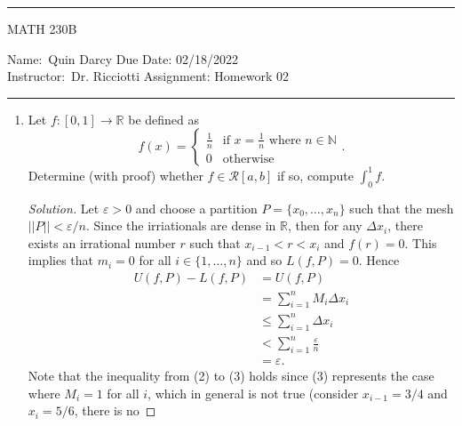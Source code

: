 \documentclass[12pt]{article}
\newenvironment{solution}
{\renewcommand\qedsymbol{$\blacksquare$}\begin{proof}[Solution]}
{\end{proof}}
\begin{document}
    \thispagestyle{empty}\hrule

    \begin{center}
        \vspace{.4cm} { \large MATH 230B}
    \end{center}
    {Name:\ Quin Darcy \hspace{\fill} Due Date: 02/18/2022   \\
    { Instructor:}\ Dr. Ricciotti \hspace{\fill} Assignment:
    Homework 02 \\ \hrule}

    \begin{enumerate}
        \item Let $f:[0, 1]\to\mathbb{R}$ be defined as 
            \begin{equation*}
                f(x)=\begin{cases}\frac{1}{n}&\text{if $x=\frac{1}{n}$ where
                    $n\in\mathbb{N}$} \\
                0 &\text{otherwise}\end{cases}.
            \end{equation*}
            Determine (with proof) whether $f\in\mathcal{R}[a, b]$ if so,
            compute $\int_{0}^{1}f$.
            \begin{solution}
                Let $\varepsilon>0$ and choose a partition $P=\{x_0, \dots,
                x_n\}$ such that the mesh $||P||<\varepsilon/n$. Since the
                irriationals are dense in $\mathbb{R}$, then for any $\Delta
                x_i$, there exists an irrational number $r$ such that
                $x_{i-1}<r<x_i$ and $f(r)=0$. This implies that $m_i=0$ for all
                $i\in\{1, \dots, n\}$ and so $L(f, P)=0$. Hence
                \begin{align}
                    U(f, P)-L(f, P) &= U(f, P) \\
                    &= \sum_{i=1}^{n}M_i\Delta x_i \\
                    &\leq \sum_{i=1}^{n}\Delta x_i \\
                    &< \sum_{i=1}^{n}\frac{\varepsilon}{n} \\
                    &= \varepsilon.
                \end{align}
                Note that the inequality from (2) to (3) holds since (3)
                represents the case where $M_i=1$ for all $i$, which in general
                is not true (consider $x_{i-1}=3/4$ and $x_i=5/6$, there is no

\end{solution}
\end{enumerate}
\end{document}
